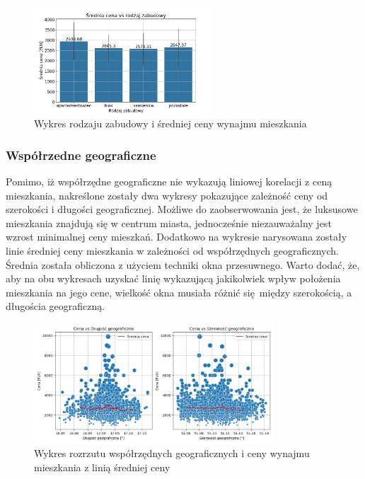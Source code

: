 \documentclass[10pt]{article}
\begin{document}
\begin{figure}[H]
    \centering
    \includegraphics[width=0.6\textwidth]{builttype-price.png}
    \caption{Wykres rodzaju zabudowy i średniej ceny wynajmu mieszkania}
    \label{fig:builttype_price}
\end{figure}

\subsubsection{Współrzedne geograficzne}

Pomimo, iż współrzędne geograficzne nie wykazują liniowej korelacji z ceną mieszkania, nakreślone zostały dwa wykresy pokazujące zależność ceny od szerokości i długości geograficznej.
Możliwe do zaobserwowania jest, że luksusowe mieszkania znajdują się w centrum miasta, jednocześnie niezauważalny jest wzrost minimalnej ceny mieszkań. 
Dodatkowo na wykresie narysowana zostały linie średniej ceny mieszkania w zależności od współrzędnych geograficznych. Średnia została obliczona z użyciem techniki okna przesuwnego.
Warto dodać, że, aby na obu wykresach uzyskać linię wykazującą jakikolwiek wpływ położenia mieszkania na jego cene, wielkość okna musiała różnić się między szerokością, a długościa geograficzną. 

\begin{figure}[H]
    \centering
    \includegraphics[width=0.8\textwidth]{coordinates-price.png}
    \caption{Wykres rozrzutu współrzędnych geograficznych i ceny wynajmu mieszkania z linią średniej ceny}
    \label{fig:coordinates_price}
\end{figure}
\end{document}
